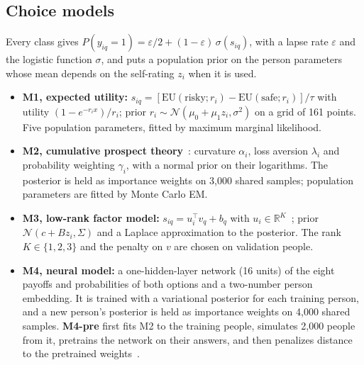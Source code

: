 \documentclass{article}
\begin{document}
\subsection{Choice models}
Every class gives $P(y_{iq} = 1) = \varepsilon/2 + (1 - \varepsilon)\,\sigma(s_{iq})$, with a lapse rate $\varepsilon$ and the logistic function $\sigma$, and puts a population prior on the person parameters whose mean depends on the self-rating $z_i$ when it is used.
\begin{itemize}
  \item \textbf{M1, expected utility:} $s_{iq} = [\mathrm{EU}(\text{risky}; r_i) - \mathrm{EU}(\text{safe}; r_i)]/\tau$ with utility $(1 - e^{-r_i x})/r_i$; prior $r_i \sim \mathcal{N}(\mu_0 + \mu_1 z_i, \sigma^2)$ on a grid of 161 points. Five population parameters, fitted by maximum marginal likelihood.
  \item \textbf{M2, cumulative prospect theory}~\citep{tversky1992}: curvature $\alpha_i$, loss aversion $\lambda_i$ and probability weighting $\gamma_i$, with a normal prior on their logarithms. The posterior is held as importance weights on 3,000 shared samples; population parameters are fitted by Monte Carlo EM.
  \item \textbf{M3, low-rank factor model:} $s_{iq} = u_i^\top v_q + b_q$ with $u_i \in \mathbb{R}^K$~\citep{koren2009}; prior $\mathcal{N}(c + B z_i, \Sigma)$ and a Laplace approximation to the posterior. The rank $K \in \{1, 2, 3\}$ and the penalty on $v$ are chosen on validation people.
  \item \textbf{M4, neural model:} a one-hidden-layer network (16 units) of the eight payoffs and probabilities of both options and a two-number person embedding. It is trained with a variational posterior for each training person, and a new person's posterior is held as importance weights on 4,000 shared samples. \textbf{M4-pre} first fits M2 to the training people, simulates 2,000 people from it, pretrains the network on their answers, and then penalizes distance to the pretrained weights~\citep{bourgin2019}.
\end{itemize}
\end{document}
